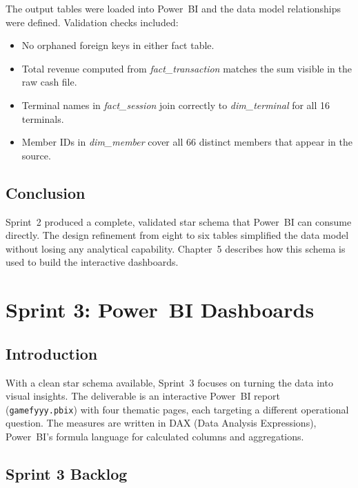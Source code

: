 The output tables were loaded into Power~BI and the data model relationships were
defined. Validation checks included:

\begin{itemize}[noitemsep]
  \item No orphaned foreign keys in either fact table.
  \item Total revenue computed from \textit{fact\_transaction} matches the sum
        visible in the raw cash file.
  \item Terminal names in \textit{fact\_session} join correctly to
        \textit{dim\_terminal} for all 16 terminals.
  \item Member IDs in \textit{dim\_member} cover all 66 distinct members that
        appear in the source.
\end{itemize}

\section{Conclusion}

Sprint~2 produced a complete, validated star schema that Power~BI can consume
directly. The design refinement from eight to six tables simplified the data model
without losing any analytical capability. Chapter~5 describes how this schema is used
to build the interactive dashboards.

\chapter{Sprint 3: Power~BI Dashboards}

\section{Introduction}

With a clean star schema available, Sprint~3 focuses on turning the data into visual
insights. The deliverable is an interactive Power~BI report (\texttt{gamefyyy.pbix})
with four thematic pages, each targeting a different operational question. The
measures are written in DAX (Data Analysis Expressions), Power~BI's formula language
for calculated columns and aggregations.

\section{Sprint 3 Backlog}


